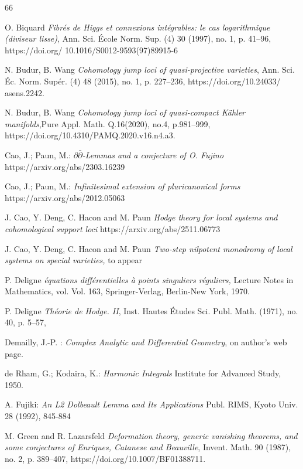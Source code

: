 \documentclass[english]{amsart}
\newcommand{\ddbar}{\partial\bar{\partial}}
\numberwithin{equation}{thm}
\begin{document}
	
	\begin{thebibliography}{66}
		
	
		
			O. Biquard  {\em Fibrés de Higgs et connexions intégrables: le cas logarithmique (diviseur
		lisse)}, Ann. Sci. École Norm. Sup. (4) 30 (1997), no. 1, p. 41–96, 
		https://doi.org/
		10.1016/S0012-9593(97)89915-6
		
		 N. Budur, B. Wang {\em Cohomology jump loci of quasi-projective varieties}, Ann. Sci. Éc. Norm. Supér. (4) 48 (2015), no. 1, p. 227–236, https://doi.org/10.24033/
		asens.2242.
		
		 N. Budur, B. Wang {\em 
Cohomology jump loci of quasi-compact Kähler manifolds},Pure Appl. Math.
Q.16(2020), no.4, p.981–999, https://doi.org/10.4310/PAMQ.2020.v16.n4.a3.

		
		 Cao, J.; Paun, M.: {\em $\ddbar$-Lemmas and a conjecture of O. Fujino} https://arxiv.org/abs/2303.16239
		
			 Cao, J.; Paun, M.: {\em 
		Infinitesimal extension of pluricanonical forms} https://arxiv.org/abs/2012.05063
		
		 	J. Cao, Y. Deng, C. Hacon and M. Paun {\em Hodge theory for local systems and cohomological support loci } https://arxiv.org/abs/2511.06773
		
		 	J. Cao, Y. Deng, C. Hacon and M. Paun {\em Two-step nilpotent monodromy of local systems on special varieties,} to appear
		
	 	P. Deligne  {\em  équations différentielles à points singuliers réguliers,} Lecture Notes in Mathematics, vol. Vol. 163, Springer-Verlag, Berlin-New York, 1970. 
		
		 P. Deligne  {\em	Théorie de Hodge. II}, Inst. Hautes Études Sci. Publ. Math. (1971), no. 40,
		p. 5–57, 
		
		
		  Demailly, J.-P. : {\em Complex Analytic and Differential Geometry}, on author's web page.
		
		
		  de Rham, G.; Kodaira, K.: {\em Harmonic Integrals} Institute for Advanced Study, 1950.
		
		  A. Fujiki: {\em An L2 Dolbeault Lemma and Its Applications}  
		Publ. RIMS, Kyoto Univ. 28 (1992), 845-884
	
		 	M. Green and R. Lazarsfeld  {\em Deformation theory, generic vanishing theorems, and
		some conjectures of Enriques, Catanese and Beauville}, Invent. Math. 90 (1987), no. 2,
		p. 389–407, https://doi.org/10.1007/BF01388711. 
		

\end{thebibliography}
\end{document}
